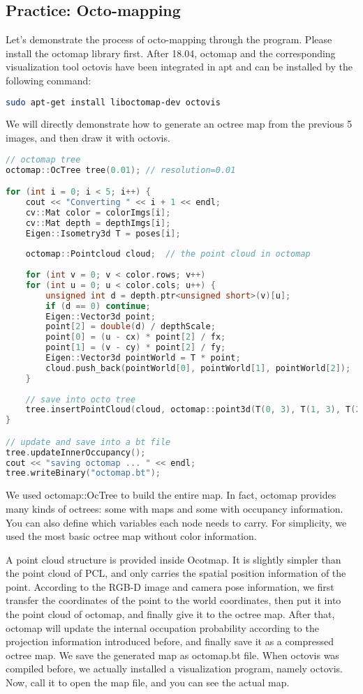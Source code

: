 \subsection{Practice: Octo-mapping}
Let's demonstrate the process of octo-mapping through the program. Please install the octomap library first. After 18.04, octomap and the corresponding visualization tool octovis have been integrated in apt and can be installed by the following command:
\begin{lstlisting}[language=sh,caption=Terminal input:]
	sudo apt-get install liboctomap-dev octovis
\end{lstlisting}
We will directly demonstrate how to generate an octree map from the previous 5 images, and then draw it with octovis.
\begin{lstlisting}[language=c++,caption=slambook/ch13/dense\_RGBD/octomap\_mapping.cpp (part)]
// octomap tree 
octomap::OcTree tree(0.01); // resolution=0.01

for (int i = 0; i < 5; i++) {
	cout << "Converting " << i + 1 << endl;
	cv::Mat color = colorImgs[i];
	cv::Mat depth = depthImgs[i];
	Eigen::Isometry3d T = poses[i];
	
	octomap::Pointcloud cloud;  // the point cloud in octomap 
	
	for (int v = 0; v < color.rows; v++)
	for (int u = 0; u < color.cols; u++) {
		unsigned int d = depth.ptr<unsigned short>(v)[u]; 
		if (d == 0) continue; 
		Eigen::Vector3d point;
		point[2] = double(d) / depthScale;
		point[0] = (u - cx) * point[2] / fx;
		point[1] = (v - cy) * point[2] / fy;
		Eigen::Vector3d pointWorld = T * point;
		cloud.push_back(pointWorld[0], pointWorld[1], pointWorld[2]);
	}
	
	// save into octo tree
	tree.insertPointCloud(cloud, octomap::point3d(T(0, 3), T(1, 3), T(2, 3)));
}

// update and save into a bt file
tree.updateInnerOccupancy();
cout << "saving octomap ... " << endl;
tree.writeBinary("octomap.bt");
\end{lstlisting}

We used octomap::OcTree to build the entire map. In fact, octomap provides many kinds of octrees: some with maps and some with occupancy information. You can also define which variables each node needs to carry. For simplicity, we used the most basic octree map without color information.

A point cloud structure is provided inside Ocotmap. It is slightly simpler than the point cloud of PCL, and only carries the spatial position information of the point. According to the RGB-D image and camera pose information, we first transfer the coordinates of the point to the world coordinates, then put it into the point cloud of octomap, and finally give it to the octree map. After that, octomap will update the internal occupation probability according to the projection information introduced before, and finally save it as a compressed octree map. We save the generated map as octomap.bt file. When octovis was compiled before, we actually installed a visualization program, namely octovis. Now, call it to open the map file, and you can see the actual map.

